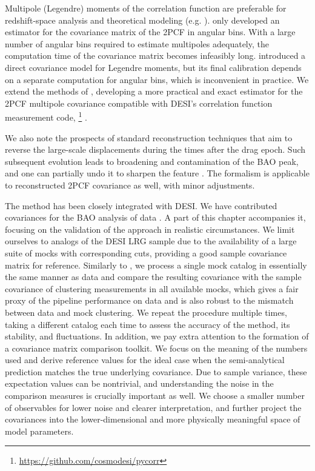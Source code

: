 Multipole (Legendre) moments of the correlation function are preferable for redshift-space analysis and theoretical modeling (e.g. \cite{using-CF-multipoles-SDSS-LRG}).
\cite{rascalC} only developed an estimator for the covariance matrix of the 2PCF in angular bins.
With a large number of angular bins required to estimate multipoles adequately, the computation time of the covariance matrix becomes infeasibly long.
\cite{rascalC-legendre-3} introduced a direct covariance model for Legendre moments, but its final calibration depends on a separate computation for angular bins, which is inconvenient in practice.
We extend the methods of \cite{rascalC,rascalC-legendre-3}, developing a more practical and exact estimator for the 2PCF multipole covariance compatible with DESI's correlation function measurement code, \pycorr{}\footnote{\url{https://github.com/cosmodesi/pycorr}} \citep{pycorr}.

We also note the prospects of standard reconstruction techniques that aim to reverse the large-scale displacements during the times after the drag epoch.
Such subsequent evolution leads to broadening and contamination of the BAO peak, and one can partially undo it to sharpen the feature \citep{BAO-recon-improvement}.
The \rascalc{} formalism is applicable to reconstructed 2PCF covariance as well, with minor adjustments.

The method has been closely integrated with DESI.
We have contributed \rascalc{} covariances for the BAO analysis of \desimtwo{} data \citep{BAO.EDR.Moon.2023}.
A part of this chapter accompanies it, focusing on the validation of the approach in realistic circumstances.
We limit ourselves to analogs of the DESI LRG sample \citep{LRG.TS.Zhou.2023} due to the availability of a large suite of mocks with corresponding cuts, providing a good sample covariance matrix for reference.
Similarly to \cite{rascalC}, we process a single mock catalog in essentially the same manner as data and compare the resulting covariance with the sample covariance of clustering measurements in all available mocks, which gives a fair proxy of the pipeline performance on data and is also robust to the mismatch between data and mock clustering.
We repeat the procedure multiple times, taking a different catalog each time to assess the accuracy of the method, its stability, and fluctuations.
In addition, we pay extra attention to the formation of a covariance matrix comparison toolkit.
We focus on the meaning of the numbers used and derive reference values for the ideal case when the semi-analytical prediction matches the true underlying covariance.
Due to sample variance, these expectation values can be nontrivial, and understanding the noise in the comparison measures is crucially important as well.
We choose a smaller number of observables for lower noise and clearer interpretation, and further project the covariances into the lower-dimensional and more physically meaningful space of model parameters.

